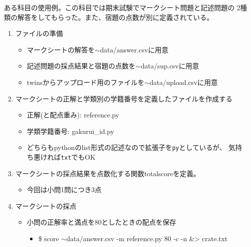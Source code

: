 ある科目の使用例。この科目では期末試験でマークシート問題と記述問題の
2種類の解答をしてもらった。また、宿題の点数が別に定義されている。

\begin{enumerate}
\item ファイルの準備

\begin{itemize}
\item マークシートの解答を\ensuremath{\sim}data\slash answer.csvに用意

\item 記述問題の採点結果と宿題の点数を\ensuremath{\sim}data\slash sup.csvに用意

\item twinsからアップロード用のファイルを\ensuremath{\sim}data\slash upload.csvに用意

\end{itemize}

\item マークシートの正解と学類別の学籍番号を定義したファイルを作成する

\begin{itemize}
\item 正解(と配点重み): reference.py

\item 学類学籍番号: gakurui\_id.py

\item どちらもpythonのlist形式の記述なので拡張子を\texttt{py}としているが、
気持ち悪ければ\texttt{txt}でもOK

\end{itemize}

\item マークシートの採点結果を点数化する関数totalscoreを定義。

\begin{itemize}
\item 今回は小問1問につき3点

\end{itemize}

\item マークシートの採点

\begin{itemize}
\item 小問の正解率と満点を80としたときの配点を保存

\begin{itemize}
\item \$ score \ensuremath{\sim}data\slash answer.csv -m reference.py 80 -c -n \&> crate.txt


\end{itemize}
\end{itemize}
\end{enumerate}
